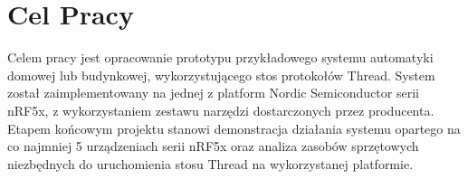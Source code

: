 \section*{Cel Pracy}

Celem pracy jest opracowanie prototypu przykładowego systemu automatyki domowej lub budynkowej, wykorzystującego stos protokołów Thread. System został zaimplementowany na jednej z platform Nordic Semiconductor serii nRF5x, z wykorzystaniem zestawu narzędzi dostarczonych przez producenta. Etapem końcowym projektu stanowi demonstracja działania systemu opartego na co najmniej 5 urządzeniach serii nRF5x oraz analiza zasobów sprzętowych niezbędnych do uruchomienia stosu Thread na wykorzystanej platformie.


\label{cha:cel}